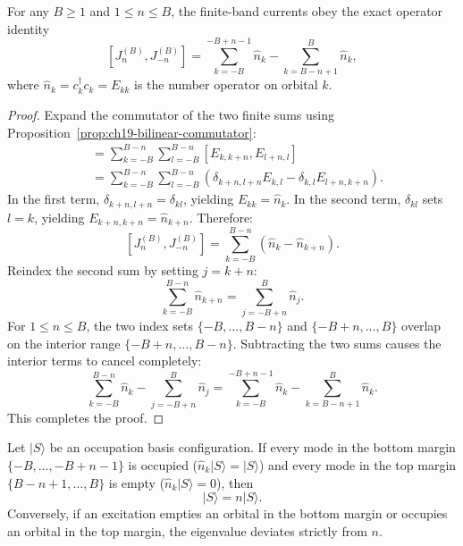 \begin{theorem}
\label{thm:ch19-current-boundary-commutator}
For any $B \ge 1$ and $1 \le n \le B$, the finite-band currents obey the exact operator identity
\begin{equation}
 \boxed{[J_n^{(B)}, J_{-n}^{(B)}]
  = \sum_{k=-B}^{-B+n-1} \hat{n}_k - \sum_{k=B-n+1}^B \hat{n}_k,}
 \label{eq:ch19-current-exact-boundary}
\end{equation}
where $\hat{n}_k = c_k^\dagger c_k = E_{kk}$ is the number operator on orbital $k$.
\end{theorem}
\begin{proof}
Expand the commutator of the two finite sums using Proposition~\ref{prop:ch19-bilinear-commutator}:
\begin{align*}
 [J_n^{(B)}, J_{-n}^{(B)}]
  &= \sum_{k=-B}^{B-n} \sum_{l=-B}^{B-n} [E_{k, k+n}, E_{l+n, l}] \\
  &= \sum_{k=-B}^{B-n} \sum_{l=-B}^{B-n} \left(\delta_{k+n, l+n} E_{k, l} - \delta_{k, l} E_{l+n, k+n}\right).
\end{align*}
In the first term, $\delta_{k+n, l+n} = \delta_{kl}$, yielding $E_{kk} = \hat{n}_k$.
In the second term, $\delta_{kl}$ sets $l = k$, yielding $E_{k+n, k+n} = \hat{n}_{k+n}$.
Therefore:
\[
 [J_n^{(B)}, J_{-n}^{(B)}]
  = \sum_{k=-B}^{B-n} (\hat{n}_k - \hat{n}_{k+n}).
\]
Reindex the second sum by setting $j = k+n$:
\[
 \sum_{k=-B}^{B-n} \hat{n}_{k+n} = \sum_{j=-B+n}^B \hat{n}_j.
\]
For $1 \le n \le B$, the two index sets $\{-B, \ldots, B-n\}$ and $\{-B+n, \ldots, B\}$
overlap on the interior range $\{-B+n, \ldots, B-n\}$.
Subtracting the two sums causes the interior terms to cancel completely:
\[
 \sum_{k=-B}^{B-n} \hat{n}_k - \sum_{j=-B+n}^B \hat{n}_j
  = \sum_{k=-B}^{-B+n-1} \hat{n}_k - \sum_{k=B-n+1}^B \hat{n}_k.
\]
This completes the proof.
\end{proof}

\begin{corollary}
\label{cor:ch19-margin-protected-action}
Let $|S\rangle$ be an occupation basis configuration.  If every mode in the bottom margin
$\{-B, \ldots, -B+n-1\}$ is occupied ($\hat{n}_k|S\rangle = |S\rangle$) and every mode in the
top margin $\{B-n+1, \ldots, B\}$ is empty ($\hat{n}_k|S\rangle = 0$), then
\begin{equation}
 [J_n^{(B)}, J_{-n}^{(B)}]|S\rangle = n |S\rangle.
 \label{eq:ch19-protected-eigenvalue}
\end{equation}
Conversely, if an excitation empties an orbital in the bottom margin or occupies an orbital
in the top margin, the eigenvalue deviates strictly from $n$.
\end{corollary}

